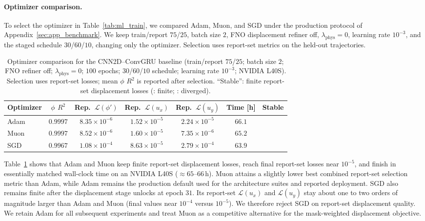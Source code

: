 \documentclass[10pt]{article}
\newcommand{\benchpass}{\textcolor{green!50!black}{\checkmark}}
\newcommand{\benchfail}{\textcolor{red}{\textbf{\texttimes}}}
\theoremstyle{definition}
\begin{document}
\paragraph{Optimizer comparison.}
To select the optimizer in Table~\ref{tab:ml_train}, we compared Adam, Muon, and SGD under the production protocol of Appendix~\ref{sec:app_benchmark}.
%
We keep train/report $75$/$25$, batch size $2$, FNO displacement refiner off, $\lambda_{\mathrm{phys}}=0$, learning rate $10^{-3}$, and the staged schedule $30$/$60$/$10$, changing only the optimizer.
%
Selection uses report-set metrics on the held-out trajectories.

\begin{table}[htbp]
\centering
\caption{Optimizer comparison for the CNN2D--ConvGRU baseline (train/report $75$/$25$; batch size $2$; FNO refiner off; $\lambda_{\mathrm{phys}}=0$; $100$ epochs; $30$/$60$/$10$ schedule; learning rate $10^{-3}$; NVIDIA L40S).
%
Selection uses report-set losses; mean $\phi$ $R^2$ is reported after selection.
%
``Stable'': finite report-set displacement losses (\benchpass{}: finite; \benchfail{}: diverged).}
\label{tab:optimizer_sweep}
\begin{tabular}{lcccccc}
\toprule
Optimizer & $\phi$ $R^2$ & Rep.\ $\mathcal{L}(\phi')$ & Rep.\ $\mathcal{L}(u_x)$ & Rep.\ $\mathcal{L}(u_y)$ & Time [h] & Stable \\
\midrule
Adam & $0.9997$ & $8.35\times10^{-6}$ & $1.52\times10^{-5}$ & $2.24\times10^{-5}$ & $66.1$ & \benchpass \\
Muon & $0.9997$ & $8.52\times10^{-6}$ & $1.60\times10^{-5}$ & $7.35\times10^{-6}$ & $65.2$ & \benchpass \\
SGD & $0.9967$ & $1.08\times10^{-4}$ & $8.63\times10^{-5}$ & $2.79\times10^{-4}$ & $63.9$ & \benchpass \\
\bottomrule
\end{tabular}
\end{table}

Table~\ref{tab:optimizer_sweep} shows that Adam and Muon keep finite report-set displacement losses, reach final report-set losses near $10^{-5}$, and finish in essentially matched wall-clock time on an NVIDIA L40S ($\approx65$--$66\,\mathrm{h}$).
%
Muon attains a slightly lower best combined report-set selection metric than Adam, while Adam remains the production default used for the architecture suites and reported deployment.
%
SGD also remains finite after the displacement stage unlocks at epoch $31$.
%
Its report-set $\mathcal{L}(u_x)$ and $\mathcal{L}(u_y)$ stay about one to two orders of magnitude larger than Adam and Muon (final values near $10^{-4}$ versus $10^{-5}$).
%
We therefore reject SGD on report-set displacement quality.
%
We retain Adam for all subsequent experiments and treat Muon as a competitive alternative for the mask-weighted displacement objective.
\end{document}

